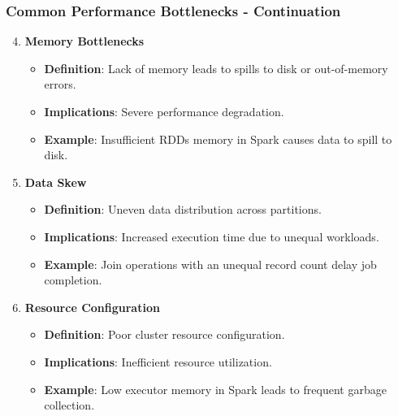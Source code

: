 \documentclass[aspectratio=169]{beamer}
\begin{document}
\begin{frame}[fragile]
    \frametitle{Common Performance Bottlenecks - Continuation}
    \begin{enumerate}
        \setcounter{enumi}{3} %
        \item \textbf{Memory Bottlenecks}
            \begin{itemize}
                \item \textbf{Definition}: Lack of memory leads to spills to disk or out-of-memory errors.
                \item \textbf{Implications}: Severe performance degradation.
                \item \textbf{Example}: Insufficient RDDs memory in Spark causes data to spill to disk.
            \end{itemize}
        
        \item \textbf{Data Skew}
            \begin{itemize}
                \item \textbf{Definition}: Uneven data distribution across partitions.
                \item \textbf{Implications}: Increased execution time due to unequal workloads.
                \item \textbf{Example}: Join operations with an unequal record count delay job completion.
            \end{itemize}

        \item \textbf{Resource Configuration}
            \begin{itemize}
                \item \textbf{Definition}: Poor cluster resource configuration.
                \item \textbf{Implications}: Inefficient resource utilization.
                \item \textbf{Example}: Low executor memory in Spark leads to frequent garbage collection.
            \end{itemize}
    \end{enumerate}
\end{frame}
\end{document}
